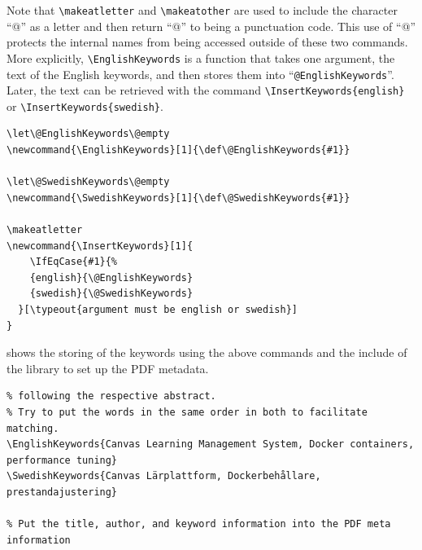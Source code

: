 \documentclass[12pt, twoside]{article}
\begin{document}
Note that \texttt{\textbackslash makeatletter} and \texttt{\textbackslash makeatother} are used to include the character “@” as a letter and then return “@” to being a punctuation code. This use of “@” protects the internal names from being accessed outside of these two commands. More explicitly, \texttt{\textbackslash EnglishKeywords} is a function that takes one argument, the text of the English keywords, and then stores them into \enquote{\texttt{@EnglishKeywords}}. Later, the text can be retrieved with the command \texttt{\textbackslash InsertKeywords\{english\}} or \texttt{\textbackslash InsertKeywords\{swedish\}}.
\begin{lstlisting}[language={[LaTeX]TeX}, caption={New commands in kththesis.cls}, label=lst:keywords]
% Keywords
\let\@EnglishKeywords\@empty
\newcommand{\EnglishKeywords}[1]{\def\@EnglishKeywords{#1}}

\let\@SwedishKeywords\@empty
\newcommand{\SwedishKeywords}[1]{\def\@SwedishKeywords{#1}}

\makeatletter
\newcommand{\InsertKeywords}[1]{
    \IfEqCase{#1}{%
    {english}{\@EnglishKeywords}
    {swedish}{\@SwedishKeywords}
  }[\typeout{argument must be english or swedish}]
}
\end{lstlisting}
 shows the storing of the keywords using the above commands and the include of the library to set up the \gls{PDF} metadata.

\begin{lstlisting}[language={[LaTeX]TeX}, caption={shows the storing of the keywords using the above commands and the include of the library to set up the PDF metadata}, label=lst:storingkeywords]
% Enter the English and Swedish keywords here for use in the PDF metadata _and_ for later use
% following the respective abstract.
% Try to put the words in the same order in both to facilitate matching.
\EnglishKeywords{Canvas Learning Management System, Docker containers, performance tuning}
\SwedishKeywords{Canvas Lärplattform, Dockerbehållare, prestandajustering}

% Put the title, author, and keyword information into the PDF meta information

\end{lstlisting}
\end{document}
